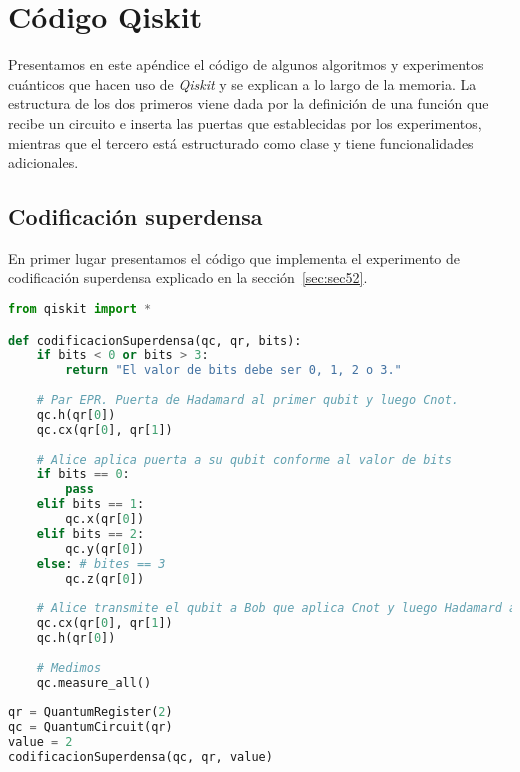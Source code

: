 \chapter{Código Qiskit}
\label{ap:ap1}
Presentamos en este apéndice el código de algunos algoritmos y experimentos cuánticos que hacen uso de \textit{Qiskit} y se explican a lo largo de la memoria. La estructura de los dos primeros viene dada por la definición de una función que recibe un circuito  e inserta las puertas que establecidas por los experimentos, mientras que el tercero está estructurado como clase y tiene funcionalidades adicionales.

\section{Codificación superdensa}
\label{sec:seca1}

En primer lugar presentamos el código que implementa el experimento de codificación superdensa explicado en la sección~\ref{sec:sec52}.
\begin{lstlisting}[language=Python]
from qiskit import *

def codificacionSuperdensa(qc, qr, bits):
    if bits < 0 or bits > 3:
        return "El valor de bits debe ser 0, 1, 2 o 3."
    
    # Par EPR. Puerta de Hadamard al primer qubit y luego Cnot.
    qc.h(qr[0])
    qc.cx(qr[0], qr[1])
    
    # Alice aplica puerta a su qubit conforme al valor de bits
    if bits == 0:
        pass
    elif bits == 1:
        qc.x(qr[0])
    elif bits == 2:
        qc.y(qr[0])
    else: # bites == 3
        qc.z(qr[0])
        
    # Alice transmite el qubit a Bob que aplica Cnot y luego Hadamard al qubit recibido
    qc.cx(qr[0], qr[1])
    qc.h(qr[0])
    
    # Medimos
    qc.measure_all()
    
qr = QuantumRegister(2)
qc = QuantumCircuit(qr)
value = 2
codificacionSuperdensa(qc, qr, value)
\end{lstlisting}

